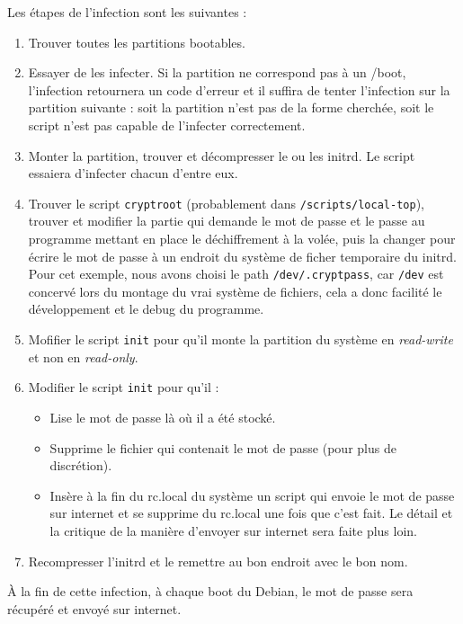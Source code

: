 \documentclass[12pt,a4paper]{article}
\begin{document}
Les étapes de l'infection sont les suivantes :
\begin{enumerate}
    \item Trouver toutes les partitions bootables.
    \item Essayer de les infecter. Si la partition ne correspond pas à un /boot,
    l'infection retournera un code d'erreur et il suffira de tenter l'infection
    sur la partition suivante : soit la partition n'est pas de la forme cherchée,
    soit le script n'est pas capable de l'infecter correctement.
    \item Monter la partition, trouver et décompresser le ou les initrd. Le
    script essaiera d'infecter chacun d'entre eux.
    \item Trouver le script \texttt{cryptroot} (probablement dans
    \texttt{/scripts/local-top}), trouver et modifier la partie qui demande le
    mot de passe et le passe au programme mettant en place le déchiffrement à la
    volée, puis la changer pour écrire le mot de passe à un endroit du système
    de ficher temporaire du initrd. Pour cet exemple, nous avons choisi le path
    \texttt{/dev/.cryptpass}, car \texttt{/dev} est concervé lors du montage
    du vrai système de fichiers, cela a donc facilité le développement et le
    debug du programme.
    \item Mofifier le script \texttt{init} pour qu'il monte la partition du
    système en \textit{read-write} et non en \textit{read-only}.
    \item Modifier le script \texttt{init} pour qu'il :
    \begin{itemize}
        \item Lise le mot de passe là où il a été stocké.
        \item Supprime le fichier qui contenait le mot de passe (pour plus de 
        discrétion).
        \item Insère à la fin du rc.local du système un script qui envoie le mot
        de passe sur internet et se supprime du rc.local une fois que c'est fait.
        Le détail et la critique de la manière d'envoyer sur internet sera faite
        plus loin.
    \end{itemize}
    \item Recompresser l'initrd et le remettre au bon endroit avec le bon nom.
\end{enumerate}

À la fin de cette infection, à chaque boot du Debian, le mot de passe sera
récupéré et envoyé sur internet.
\end{document}
